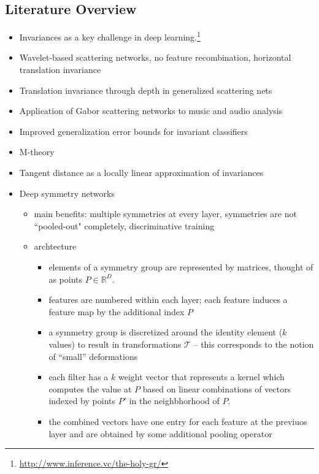 \documentclass{article}
\renewcommand{\Re}{{\mathbb R}}
\begin{document}
\subsection*{Literature Overview} 
\begin{itemize}
\setlength{\itemsep}{0.3mm}
\item Invariances as a key challenge in deep learning.\footnote{\url{http://www.inference.vc/the-holy-gr/}} 
\item Wavelet-based scattering networks, no feature recombination, horizontal translation invariance \cite{bruna2013invariant}
\item Translation invariance through depth in generalized scattering nets \cite{wiatowski2015mathematical}
\item Application of Gabor scattering networks to music \cite{bammer2017invariance} and audio analysis \cite{bammer2017gabor}
\item Improved generalization error bounds for invariant classifiers \cite{sokolic2016generalization}
\item M-theory \cite{anselmi2016unsupervised,anselmi2013unsupervised}
\item Tangent distance as a locally linear approximation of invariances \cite{simard1993efficient}
\item Deep symmetry networks \cite{gens2014deep}
\begin{itemize}
\item main benefits: multiple symmetries at every layer, symmetries are not ``pooled-out" completely, discriminative training 
\item archtecture 
\begin{itemize}
\item elements of a symmetry group are represented by matrices, thought of as points $P \in \Re^D$.
\item features are numbered within each layer; each feature induces a feature map by the additional index $P$ 
\item a symmetry group is discretized around the identity element ($k$ values) to result in transformations $\mathcal T$ -- this corresponds to the notion of ``small'' deformations
\item each filter has a $k$ weight vector that represents a kernel which computes the value at $P$ based on linear combinations of vectors indexed by points $P'$ in the neighbhorhood of $P$. 
\item the combined vectors have one entry for each feature at the previuos layer and are obtained by some additional pooling operator
\end{itemize}
\end{itemize}
\end{itemize}




\end{document}
